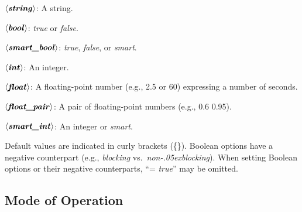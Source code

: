 \documentclass[a4paper,12pt]{article}
\def\qtybf#1{$\mathbf{\left<\textbf{\textit{#1\/}}\right>}$}
\renewcommand\_{\hbox{\textunderscore\kern-.05ex}}
\begin{document}
\begin{enum}
\item[\labelitemi] \qtybf{string}: A string.
\item[\labelitemi] \qtybf{bool\/}: \textit{true} or \textit{false}.
\item[\labelitemi] \qtybf{smart\_bool\/}: \textit{true}, \textit{false}, or
\textit{smart}.
\item[\labelitemi] \qtybf{int\/}: An integer.
\item[\labelitemi] \qtybf{float}: A floating-point number (e.g., 2.5 or 60)
expressing a number of seconds.
\item[\labelitemi] \qtybf{float\_pair\/}: A pair of floating-point numbers
(e.g., 0.6 0.95).
\item[\labelitemi] \qtybf{smart\_int\/}: An integer or \textit{smart}.
\end{enum}

Default values are indicated in curly brackets (\textrm{\{\}}). Boolean options
have a negative counterpart (e.g., \textit{blocking} vs.\
\textit{non\_blocking}). When setting Boolean options or their negative
counterparts, ``= \textit{true\/}'' may be omitted.

\subsection{Mode of Operation}
\label{mode-of-operation}
\end{document}
